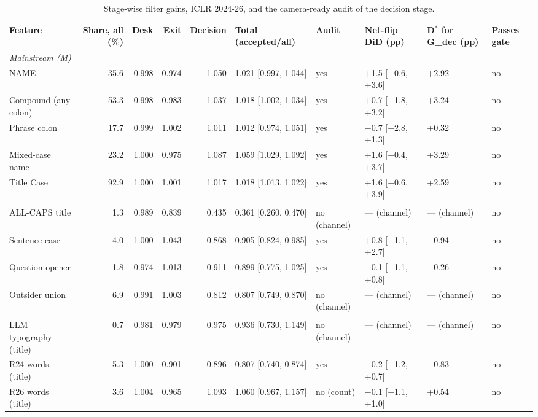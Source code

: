 \begin{table}[t]
\centering
\scriptsize
\caption{Stage-wise filter gains, ICLR 2024-26, and the camera-ready audit of the decision stage.}
\label{tab:filter}
\begin{tabular}{l r r r r l l l l l}
\toprule
Feature & Share, all (\%) & Desk & Exit & Decision & Total (accepted/all) & Audit & Net-flip DiD (pp) & D$^{*}$ for G\_dec (pp) & Passes gate \\
\midrule
\multicolumn{10}{l}{\textit{Mainstream (M)}} \\
NAME & 35.6 & 0.998 & 0.974 & 1.050 & 1.021 [0.997, 1.044] & yes & +1.5 [$-$0.6, +3.6] & +2.92 & no \\
Compound (any colon) & 53.3 & 0.998 & 0.983 & 1.037 & 1.018 [1.002, 1.034] & yes & +0.7 [$-$1.8, +3.2] & +3.24 & no \\
Phrase colon & 17.7 & 0.999 & 1.002 & 1.011 & 1.012 [0.974, 1.051] & yes & $-$0.7 [$-$2.8, +1.3] & +0.32 & no \\
Mixed-case name & 23.2 & 1.000 & 0.975 & 1.087 & 1.059 [1.029, 1.092] & yes & +1.6 [$-$0.4, +3.7] & +3.29 & no \\
Title Case & 92.9 & 1.000 & 1.001 & 1.017 & 1.018 [1.013, 1.022] & yes & +1.6 [$-$0.6, +3.9] & +2.59 & no \\
\addlinespace
\multicolumn{10}{l}{\textit{Outsider (O)}} \\
ALL-CAPS title & 1.3 & 0.989 & 0.839 & 0.435 & 0.361 [0.260, 0.470] & no (channel) & --- (channel) & --- (channel) & no \\
Sentence case & 4.0 & 1.000 & 1.043 & 0.868 & 0.905 [0.824, 0.985] & yes & +0.8 [$-$1.1, +2.7] & $-$0.94 & no \\
Question opener & 1.8 & 0.974 & 1.013 & 0.911 & 0.899 [0.775, 1.025] & yes & $-$0.1 [$-$1.1, +0.8] & $-$0.26 & no \\
Outsider union & 6.9 & 0.991 & 1.003 & 0.812 & 0.807 [0.749, 0.870] & no (channel) & --- (channel) & --- (channel) & no \\
\addlinespace
\multicolumn{10}{l}{\textit{LLM-style (L)}} \\
LLM typography (title) & 0.7 & 0.981 & 0.979 & 0.975 & 0.936 [0.730, 1.149] & no (channel) & --- (channel) & --- (channel) & no \\
R24 words (title) & 5.3 & 1.000 & 0.901 & 0.896 & 0.807 [0.740, 0.874] & yes & $-$0.2 [$-$1.2, +0.7] & $-$0.83 & no \\
R26 words (title) & 3.6 & 1.004 & 0.965 & 1.093 & 1.060 [0.967, 1.157] & no (count) & $-$0.1 [$-$1.1, +1.0] & +0.54 & no \\

\end{tabular}
\end{table}
